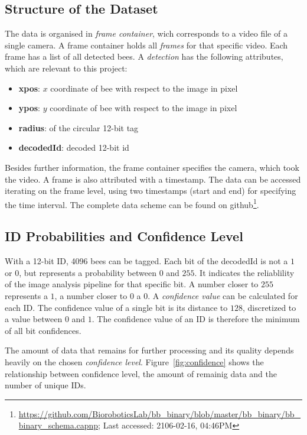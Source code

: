 \subsection{Structure of the Dataset}
The data is organised in \emph{frame container}, wich corresponds to a video file of a single camera. A frame container holds all \emph{frames} for that specific video.
Each frame has a list of all detected bees.
A \emph{detection} has the following attributes, which are relevant to this project:

\begin{itemize}
\item \textbf{xpos}: $x$ coordinate of bee with respect to the image in pixel
\item \textbf{ypos}: $y$ coordinate of bee with respect to the image in pixel
\item \textbf{radius}: of the circular 12-bit tag
\item \textbf{decodedId}: decoded 12-bit id
\end{itemize}

Besides further information, the frame container specifies the camera, which took the video. A frame is also attributed with a timestamp. The data can be accessed iterating on the frame level, using two timestamps (start and end) for specifying the time interval. The complete data scheme can be found on github\footnote{\url{https://github.com/BioroboticsLab/bb_binary/blob/master/bb_binary/bb_binary_schema.capnp}; Last accessed: 2106-02-16, 04:46PM}. 


\subsection{ID Probabilities and Confidence Level}
\label{subsec:confidence}
With a 12-bit ID, 4096 bees can be tagged.
Each bit of the decodedId is not a $1$ or $0$, but represents a probability between $0$ and $255$. It indicates the reliablility of the image analysis pipeline for that specific bit.  A number closer to $255$ represents a $1$, a number closer to $0$ a $0$.
A \emph{confidence value} can be calculated for each ID. The confidence value of a single bit is its distance to $128$, discretized to a value between $0$ and $1$. The confidence value of an ID is therefore the minimum of all bit confidences.

The amount of data that remains for further processing and its quality  depends heavily on the chosen \emph{confidence level}. Figure~\ref{fig:confidence} shows the relationship between confidence level, the amount of remainig data and the number of unique IDs. 

